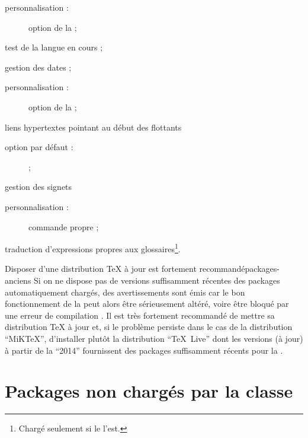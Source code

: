 \begin{description}
\begin{description}
  \item[personnalisation :] option  de la \yatCl ;
  \end{description}
\item[\package*{iflang} :] test de la langue en cours ;
\item[\package{datetime} :] gestion des dates ;
  \begin{description}
  \item[personnalisation :] option  de la \yatCl ;
  \end{description}
\item[\package*{hypcap} :] liens hypertextes pointant au début des
  flottants%
  \begin{description}
  \item[option par défaut :]  ;
  \end{description}
\item[\package{bookmark} :] gestion des signets%
  \begin{description}
  \item[personnalisation :] commande propre  ;
  \end{description}
\item[\package*{glossaries-babel} :] traduction d'expressions propres aux
  glossaires\footnote{Chargé seulement si le  l'est.}.
\end{description}

\begin{dbremark}{Disposer d'une distribution \TeX{} à jour est fortement
    recommandé}{packages-anciens}
  Si on ne dispose pas de versions suffisamment récentes des packages
  automatiquement chargés, des avertissements sont émis car le bon
  fonctionnement de la \yatCl{} peut alors être sérieusement altéré, voire être
  bloqué par une erreur de compilation . Il
  est très fortement recommandé de mettre sa distribution \TeX{} à jour et, si
  le problème persiste dans le cas de la distribution \enquote{MiK\TeX{}},
  d'installer plutôt la distribution \enquote{\TeX~Live} dont les versions (à
  jour) à partir de la \enquote{2014} fournissent des packages suffisamment
  récents pour la \yatCl.
\end{dbremark}

\section{Packages non  chargés par la classe}\label{sec-packages-non-charges}

